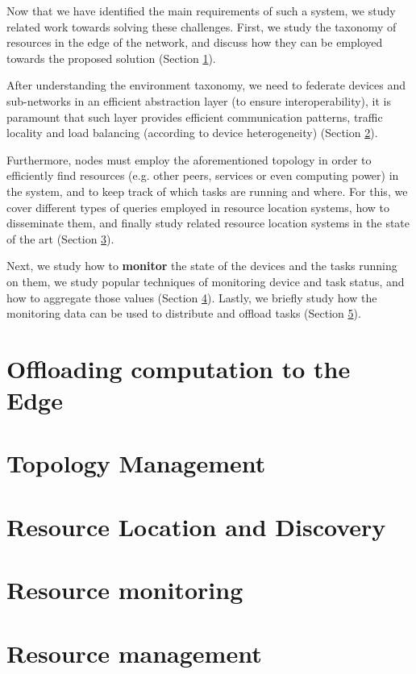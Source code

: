 Now that we have identified the main requirements of such a system, we study related work towards solving these challenges. First, we study the taxonomy of resources in the edge of the network, and discuss how they can be employed towards the proposed solution (Section \ref{sec:offloading_computation}).

After understanding the environment taxonomy, we need to federate devices and sub-networks in an efficient abstraction layer (to ensure interoperability), it is paramount that such layer provides efficient communication patterns, traffic locality and load balancing (according to device heterogeneity) (Section \ref{sec:topology_management}).

Furthermore, nodes must employ the aforementioned topology in order to efficiently find resources (e.g. other peers, services or even computing power) in the system, and to keep track of which tasks are running and where. For this, we cover different types of queries employed in resource location systems, how to disseminate them, and finally study related resource location systems in the state of the art (Section \ref{sec:res_location}).

Next, we study how to \textbf{monitor} the state of the devices and the tasks running on them, we study popular techniques of monitoring device and task status, and how to aggregate those values (Section \ref{sec:res_monitoring}). Lastly, we briefly study how the monitoring data can be used to distribute and offload tasks (Section \ref{sec:res_management}). 

\section{Offloading computation to the Edge} \label{sec:offloading_computation} 

\section{Topology Management} \label{sec:topology_management} 

\section{Resource Location and Discovery} \label{sec:res_location} 

\section{Resource monitoring} \label{sec:res_monitoring} 

\section{Resource management} \label{sec:res_management} 


